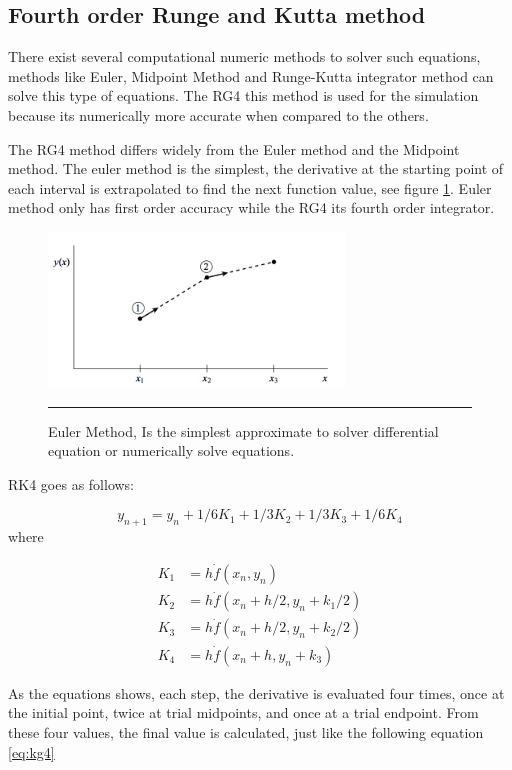 \subsection{Fourth order Runge and Kutta method}

There exist several computational numeric methods to solver such equations, methods like Euler, Midpoint Method and Runge-Kutta integrator method can solve this type of equations. The RG4 this method is used for the simulation because its numerically more accurate when compared to the others.

The RG4 method differs widely from the Euler method and the Midpoint method. The euler method is the simplest, the derivative at the starting point of each interval is extrapolated to find the next function value, see figure \ref{fig:euler}. Euler method only has first order accuracy while the RG4 its fourth order integrator.

\begin{figure}[htbp]
	\centering
		\includegraphics[width=0.7\textwidth]{Figures/euler.png}
		\rule{35em}{0.5pt}
	\caption[Euler Method]{Euler Method, Is the simplest approximate to solver differential equation or numerically solve equations.}
	\label{fig:euler}
\end{figure}

RK4 goes as follows:

\begin{equation} \label{eq:kg4}
y_{n+1} = y_{n} + 1/6 K_{1} + 1/3 K_{2} +1/3 K_{3} + 1/6 K_{4}
\end{equation}
where

\begin{align*}
K_{1} &= h \dot f(x_{n}, y_{n}) \\
K_{2} &= h \dot f(x_{n} + h/2, y_{n} + k_{1}/2) \\
K_{3} &= h \dot f(x_{n} + h/2, y_{n} + k_{2}/2) \\
K_{4} &= h \dot f(x_{n} + h, y_{n} + k_{3})
\end{align*}

As the equations shows, each step, the derivative is evaluated four times, once at the initial point, twice at trial midpoints, and once at a trial endpoint. From these four values, the final value is calculated, just like the following equation \ref{eq:kg4}

